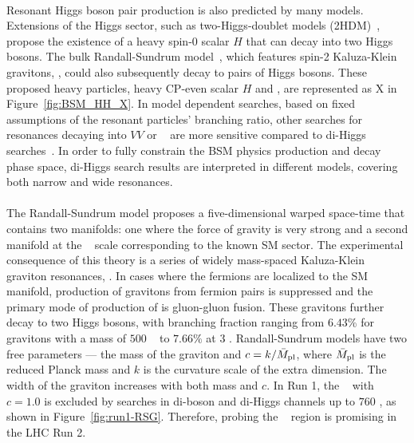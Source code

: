 \paragraph{}
Resonant Higgs boson pair production is also predicted by many models. Extensions of the Higgs sector, such as two-Higgs-doublet models (2HDM)~\cite{PhysRevD.8.1226, Branco:2011iw}, propose the existence of a heavy spin-0 scalar $H$ that can decay into two Higgs bosons. 
The bulk Randall-Sundrum model~\cite{Agashe:2007zd, Fitzpatrick}, which features spin-2 Kaluza-Klein gravitons, \Grav, could also subsequently decay to pairs of Higgs bosons. 
These proposed heavy particles, heavy CP-even scalar $H$ and \Grav, are represented as X in Figure~\ref{fig:BSM_HH_X}.
In model dependent searches, based on fixed assumptions of the resonant particles' branching ratio, other searches for resonances decaying into $VV$ or \ttbar~ are more sensitive compared to di-Higgs searches~\cite{Cavaliere:2203605}. 
In order to fully constrain the BSM physics production and decay phase space, di-Higgs search results are interpreted in different models, covering both narrow and wide resonances.

\paragraph{}
The Randall-Sundrum model proposes a five-dimensional warped space-time that contains two manifolds: one where the force of gravity is very strong and a second manifold at the \TeV~ scale corresponding to the known SM sector.
The experimental consequence of this theory is a series of widely mass-spaced Kaluza-Klein graviton resonances, \Grav. 
In cases where the fermions are localized to the SM manifold, production of gravitons from fermion pairs is suppressed and the primary mode of production of \Grav is gluon-gluon fusion. 
These gravitons further decay to two Higgs bosons, with branching fraction ranging from $6.43$\% for gravitons with a mass of $500$ \GeV~ to $7.66\%$ at $3$ \TeV.
Randall-Sundrum models have two free parameters --- the mass of the graviton and $c = k/\bar{M}_{\rm pl}$, where $\bar{M}_{\rm pl}$ is the reduced Planck mass and $k$ is the curvature scale of the extra dimension. 
The width of the graviton increases with both mass and $c$.
In Run 1, the \Grav~ with $c=1.0$ is excluded by searches in di-boson and di-Higgs channels up to $760$ \GeV, as shown in Figure~\ref{fig:run1-RSG}.
Therefore, probing the \TeV~ region is promising in the LHC Run 2.

